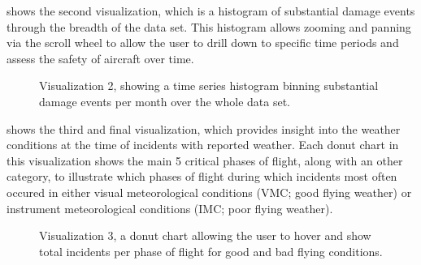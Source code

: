 \documentclass{article}
\begin{document}
     shows the second visualization, which is a histogram of substantial damage events through the breadth of the data set. This histogram allows zooming and panning via the scroll wheel to allow the user to drill down to specific time periods and assess the safety of aircraft over time.

    \begin{figure}[htb]
      \centering
      \caption{Visualization 2, showing a time series histogram binning substantial damage events per month over the whole data set.}
      \label{fig:v2}
    \end{figure}

     shows the third and final visualization, which provides insight into the weather conditions at the time of incidents with reported weather. Each donut chart in this visualization shows the main 5 critical phases of flight, along with an other category, to illustrate which phases of flight during which incidents most often occured in either visual meteorological conditions (VMC; good flying weather) or  instrument meteorological conditions (IMC; poor flying weather).

    \begin{figure}[htb]
      \centering
      \caption{Visualization 3, a donut chart allowing the user to hover and show total incidents per phase of flight for good and bad flying conditions.}
      \label{fig:v3}
    \end{figure}
\end{document}
